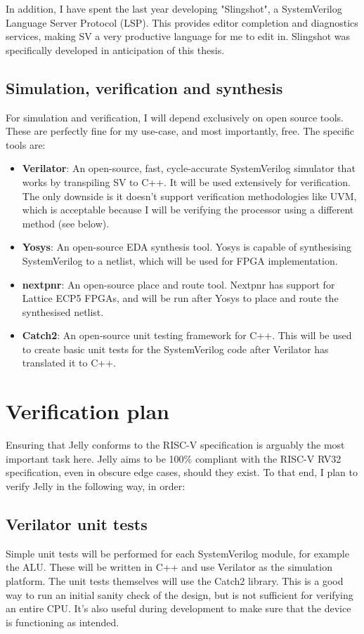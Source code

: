\documentclass{article}
\begin{document}
In addition, I have spent the last year developing "Slingshot", a SystemVerilog Language Server Protocol 
(LSP). This provides editor completion and diagnostics services, making SV a very productive language for
me to edit in. Slingshot was specifically developed in anticipation of this thesis.

\subsection{Simulation, verification and synthesis}
For simulation and verification, I will depend exclusively on open source tools. These are perfectly fine for
my use-case, and most importantly, free. The specific tools are:
\begin{itemize}
	\item \textbf{Verilator}: An open-source, fast, cycle-accurate SystemVerilog simulator that works by 
		transpiling SV to C++. It will be used extensively for verification. The only downside is it 
		doesn't support verification methodologies like UVM, which is acceptable because I will be 
		verifying the processor using a different method (see below).
	\item \textbf{Yosys}: An open-source EDA synthesis tool. Yosys is capable of synthesising SystemVerilog 
		to a netlist, which will be used for FPGA implementation.
	\item \textbf{nextpnr}: An open-source place and route tool. Nextpnr has support for Lattice ECP5 
		FPGAs, and will be run after Yosys to place and route the synthesised netlist.
	\item \textbf{Catch2}: An open-source unit testing framework for C++. This will be used to create 
		basic unit tests for the SystemVerilog code after Verilator has translated it to C++.
\end{itemize}

\section{Verification plan}
Ensuring that Jelly conforms to the RISC-V specification is arguably the most important task here. Jelly aims
to be 100\% compliant with the RISC-V RV32 specification, even in obscure edge cases, should they exist.
To that end, I plan to verify Jelly in the following way, in order:

\subsection{Verilator unit tests}
Simple unit tests will be performed for each SystemVerilog module, for example the ALU. These will be written
in C++ and use Verilator as the simulation platform. The unit tests themselves will use the Catch2 library.
This is a good way to run an initial sanity check of the design, but is not sufficient for verifying an
entire CPU. It's also useful during development to make sure that the device is functioning as intended.
\end{document}
